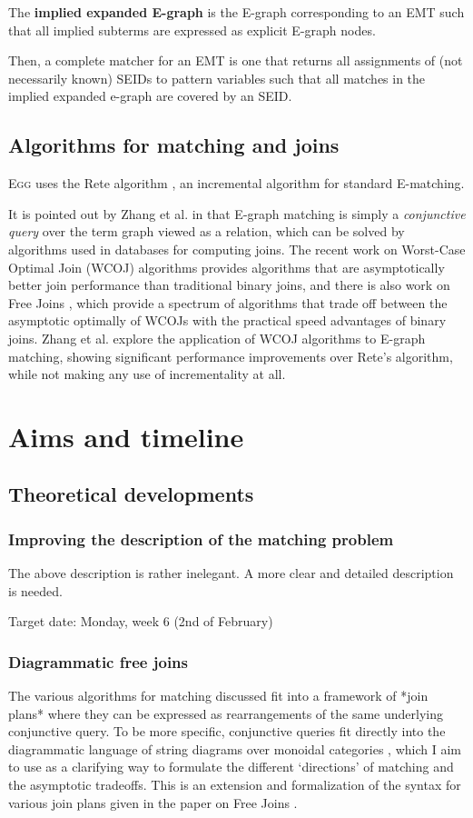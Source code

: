 \documentclass{article}
\theoremstyle{definition}
\begin{document}
The \textbf{implied expanded E-graph} is the E-graph corresponding to an EMT such that all implied subterms are expressed as explicit E-graph nodes.

Then, a complete matcher for an EMT is one that returns all assignments of (not necessarily known) SEIDs to pattern variables such that all matches in the implied expanded e-graph are covered by an SEID.

\subsection{Algorithms for matching and joins}
\textsc{Egg} uses the Rete algorithm \cite{forgy1989rete}, an incremental algorithm for standard E-matching.

It is pointed out by Zhang et al. in \citep{zhang2021relational} that E-graph matching is simply a \textit{conjunctive query} over the term graph viewed as a relation, which can be solved by algorithms used in databases for computing joins. The recent work on
Worst-Case Optimal Join (WCOJ) algorithms \cite{ngo2018worst} provides algorithms that are asymptotically better join performance than traditional binary joins, and there is also work on Free Joins \cite{wang2023free}, which provide a spectrum of algorithms that trade off between the asymptotic optimally of WCOJs with the practical speed advantages of binary joins. Zhang et al. explore the application of WCOJ algorithms to E-graph matching, showing significant performance improvements over Rete's algorithm, while not making any use of incrementality at all.

\section{Aims and timeline}
\subsection{Theoretical developments}
\subsubsection{Improving the description of the matching problem}
The above description is rather inelegant. A more clear and detailed description is needed.

Target date: Monday, week 6 (2nd of February)

\subsubsection{Diagrammatic free joins}
The various algorithms for matching discussed fit into a framework of *join plans* \cite{wang2023free} where they can be expressed as rearrangements of the same underlying conjunctive query. To be more specific, conjunctive queries fit directly into the diagrammatic language of string diagrams over monoidal categories \citep{selinger2010survey}, which I aim to use as a clarifying way to formulate the different `directions' of matching and the asymptotic tradeoffs. This is an extension and formalization of the syntax for various join plans given in the paper on Free Joins \cite{wang2023free}.
\end{document}
